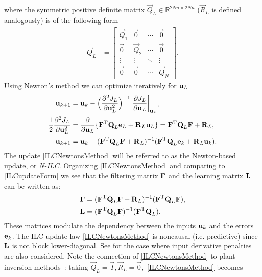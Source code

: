 \noindent where the symmetric positive definite matrix $\vec{Q}_L \in \mathbb{R}^{2Nn \times 2Nn}$ ($\vec{R}_L$ is defined analogously) is of the following form
%
\begin{equation}
\begin{aligned}
 \vec{Q}_L &= 
 \begin{bmatrix}
  \vec{Q}_1 & \vec{0} & \cdots & \vec{0} \\
  \vec{0} & \vec{Q}_2 & \cdots & \vec{0} \\
  \vdots  & \vdots  & \ddots & \vdots  \\
  \vec{0} & \vec{0} & \cdots & \vec{Q}_N
 \end{bmatrix}.
\end{aligned}
\label{Qmatrix}
\end{equation}
%
\noindent Using Newton's method we can optimize iteratively for $\boldsymbol{\mathrm{u}}_L$
%
\begin{equation}
\begin{aligned}
\boldsymbol{\mathrm{u}}_{k+1} &= \boldsymbol{\mathrm{u}}_k - \Big(\frac{\partial^{2}J_L}{\partial\boldsymbol{\mathrm{u}}^{2}_L}\Big)^{-1}\left.\frac{\partial{J_L}}{\partial{\boldsymbol{\mathrm{u}}_L}}\right|_{\boldsymbol{\mathrm{u}}_k}, \\
\frac{1}{2}\frac{\partial^{2}J_L}{\partial\boldsymbol{\mathrm{u}}^{2}_L} &= \frac{\partial}{\partial\boldsymbol{\mathrm{u}}_L}\{\boldsymbol{\mathrm{F}}^{\mathrm{T}}\boldsymbol{\mathrm{Q}}_L\boldsymbol{\mathrm{e}}_L + \boldsymbol{\mathrm{R}}_L\boldsymbol{\mathrm{u}}_L\} = \boldsymbol{\mathrm{F}}^{\mathrm{T}}\boldsymbol{\mathrm{Q}}_L\boldsymbol{\mathrm{F}} + \boldsymbol{\mathrm{R}}_L, \\
\boldsymbol{\mathrm{u}}_{k+1} &= \boldsymbol{\mathrm{u}}_k - (\boldsymbol{\mathrm{F}}^{\mathrm{T}}\boldsymbol{\mathrm{Q}}_L\boldsymbol{\mathrm{F}} + \boldsymbol{\mathrm{R}}_L)^{-1}(\boldsymbol{\mathrm{F}}^{\mathrm{T}}\boldsymbol{\mathrm{Q}}_L\boldsymbol{\mathrm{e}}_k + \boldsymbol{\mathrm{R}}_L\boldsymbol{\mathrm{u}}_k).
\end{aligned}
\label{ILCNewtonsMethod}
\end{equation}
%
\noindent The update \eqref{ILCNewtonsMethod} will be referred to as the Newton-based update, or \emph{N-ILC}. Organizing \eqref{ILCNewtonsMethod} and comparing to \eqref{ILCupdateForm} we see that the filtering matrix $\boldsymbol{\mathrm{\Gamma}}$ and the learning matrix $\boldsymbol{\mathrm{L}}$ can be written as:
%
\begin{equation}
\begin{aligned}
\boldsymbol{\mathrm{\Gamma}} &= (\boldsymbol{\mathrm{F}}^{\mathrm{T}}\boldsymbol{\mathrm{Q}}_L\boldsymbol{\mathrm{F}} + \boldsymbol{\mathrm{R}}_L)^{-1}(\boldsymbol{\mathrm{F}}^{\mathrm{T}}\boldsymbol{\mathrm{Q}}_L\boldsymbol{\mathrm{F}}),\\
\boldsymbol{\mathrm{L}} &= (\boldsymbol{\mathrm{F}}^{\mathrm{T}}\boldsymbol{\mathrm{Q}}_L\boldsymbol{\mathrm{F}})^{-1}(\boldsymbol{\mathrm{F}}^{\mathrm{T}}\boldsymbol{\mathrm{Q}}_L).
\end{aligned}
\label{qAndlMatrices}
\end{equation}
%
\noindent These matrices modulate the dependency between the inputs $\boldsymbol{\mathrm{u}}_k$ and the errors $\boldsymbol{\mathrm{e}}_k$. The ILC update law \eqref{ILCNewtonsMethod} is noncausal (i.e. predictive) since $\boldsymbol{\mathrm{L}}$ is not block lower-diagonal. See \cite{Amann95,Gunnarsson01} for the case where input derivative penalties are also considered. Note the connection of \eqref{ILCNewtonsMethod} to plant inversion methods~\cite{Ghosh99}: taking $\vec{Q}_L = \vec{I}, \vec{R}_{L} = \vec{0},$ \eqref{ILCNewtonsMethod} becomes
